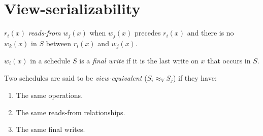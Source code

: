 \section{View-serializability}

\begin{definition}
    $r_i(x)$ \emph{reads-from} $w_j(x)$ when  $w_j(x)$  precedes  $r_i(x)$ and there is no  $w_k(x)$ in $S$ between  $r_i(x)$  and  $w_j(x)$. 
    
    $w_i(x)$ in a schedule $S$ is a \emph{final write} if it is the last write on $x$ that occurs in $S$. 


    Two schedules are said to be \emph{view-equivalent} ($S_i \approx_V S_j$) if they have:
    \begin{enumerate}
        \item The same operations. 
        \item The same reads-from relationships.
        \item The same final writes. 
    \end{enumerate}
\end{definition}

